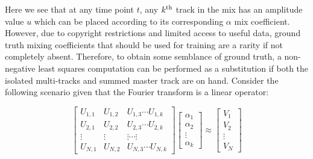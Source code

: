 \documentclass{article}
\begin{document}
Here we see that at any time point $t$, any $k\textsuperscript{th}$ track in the mix has an amplitude value $u$ which can be placed according to its corresponding $\alpha$ mix coefficient.  However, due to copyright restrictions and limited access to useful data, ground truth mixing coefficients that should be used for training are a rarity if not completely absent. Therefore, to obtain some semblance of ground truth, a non-negative least squares computation can be performed as a substitution if both the isolated multi-tracks and summed master track are on hand.  Consider the following scenario given that the Fourier transform is a linear operator:


\[
\begin{equation}
 \begin{bmatrix}
       U_{1,1} & U_{1,2} & U_{1,3} \cdots U_{1,k} \\[0.3em]
       U_{2,1} & U_{2,2} & U_{2,3} \cdots U_{2,k} \\[0.3em]
       \vdots & \vdots & \vdots \cdots \vdots     \\[0.3em]
       U_{N,1} & U_{N,2} & U_{N,3} \cdots U_{N,k}
 \end{bmatrix}
 \begin{bmatrix}
       \alpha_{1} \\[0.3em]
       \alpha_{2} \\[0.3em]
       \vdots     \\[0.3em]
       \alpha_{k}
 \end{bmatrix}
\approx
 \begin{bmatrix}
       V_{1} \\[0.3em]
       V_{2} \\[0.3em]
       \vdots\\[0.3em]
       V_{N}
 \end{bmatrix}
 \label{eq:stftlinear}
\end{equation}
\]
\end{document}
